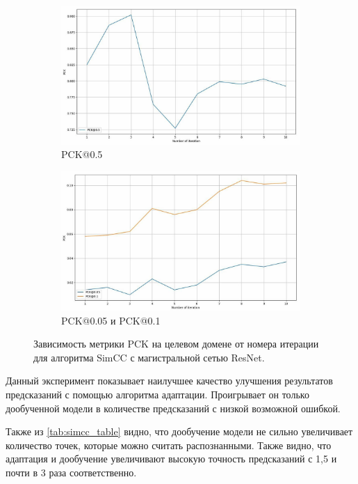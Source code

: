 \begin{figure}[H]
\centering
\begin{subfigure}{.95\textwidth}
	\centering
	\includegraphics[width=\textwidth]{./images/results/simcc/simcc_pck}
	\caption{PCK@0.5}
	\label{fig:simcc_pck_05}
\end{subfigure}
\begin{subfigure}{.95\textwidth}
	\centering
	\includegraphics[width=\textwidth]{./images/results/simcc/simcc_pck_small}
	\caption{PCK@0.05 и PCK@0.1}
	\label{fig:simcc_pck_small}
\end{subfigure}
\caption{Зависимость метрики PCK на целевом домене от номера итерации для алгоритма SimCC с магистральной сетью ResNet.}
\label{fig:simcc_pck}
\end{figure}

Данный эксперимент показывает наилучшее качество улучшения результатов предсказаний с помощью алгоритма адаптации. Проигрывает он только дообученной модели в количестве предсказаний с низкой возможной ошибкой. 

Также из \autoref{tab:simcc_table} видно, что дообучение модели не сильно увеличивает количество точек, которые можно считать распознанными. Также видно, что адаптация и дообучение увеличивают высокую точность предсказаний с 1,5 и почти в 3 раза соответственно.

